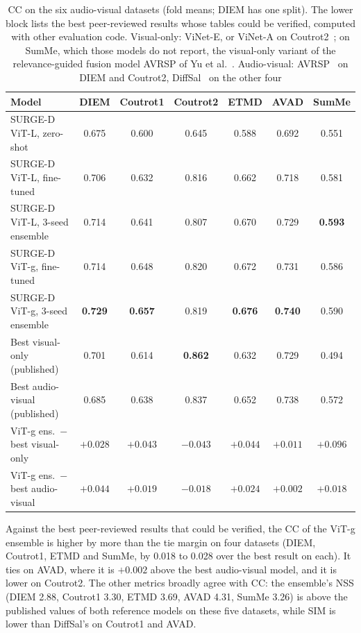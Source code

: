\begin{table}[htbp]
  \centering
  \caption{\acrshort{CC} on the six audio-visual datasets (fold means; DIEM has one split).
  The lower block lists the best peer-reviewed results whose tables could be
  verified, computed with other evaluation code. Visual-only: ViNet-E, or ViNet-A
  on Coutrot2~\cite{girmaji2025minimalistic}; on SumMe, which those models do not
  report, the visual-only variant of the relevance-guided fusion model AVRSP of
  Yu et al.~\cite{yu2026relevance}. Audio-visual: AVRSP~\cite{yu2026relevance} on
  DIEM and Coutrot2, DiffSal~\cite{xiong2024diffsal} on the other four}\label{tab:av}
  \footnotesize
  \setlength{\tabcolsep}{4pt}
  \begin{tabular}{@{}lcccccc@{}}
    \toprule
    \textbf{Model} & \textbf{DIEM} & \textbf{Coutrot1} & \textbf{Coutrot2} & \textbf{ETMD}
      & \textbf{AVAD} & \textbf{SumMe} \\
    \midrule
    SURGE-D \acrshort{ViT}-L, zero-shot       & 0.675 & 0.600 & 0.645 & 0.588 & 0.692 & 0.551 \\
    SURGE-D \acrshort{ViT}-L, fine-tuned      & 0.706 & 0.632 & 0.816 & 0.662 & 0.718 & 0.581 \\
    SURGE-D \acrshort{ViT}-L, 3-seed ensemble & 0.714 & 0.641 & 0.807 & 0.670 & 0.729 & \textbf{0.593} \\
    SURGE-D \acrshort{ViT}-g, fine-tuned      & 0.714 & 0.648 & 0.820 & 0.672 & 0.731 & 0.586 \\
    SURGE-D \acrshort{ViT}-g, 3-seed ensemble & \textbf{0.729} & \textbf{0.657} & 0.819 & \textbf{0.676} & \textbf{0.740} & 0.590 \\
    \midrule
    Best visual-only (published)   & 0.701 & 0.614 & \textbf{0.862} & 0.632 & 0.729 & 0.494 \\
    Best audio-visual (published)  & 0.685 & 0.638 & 0.837 & 0.652 & 0.738 & 0.572 \\
    \midrule
    \acrshort{ViT}-g ens.\ $-$ best visual-only  & $+0.028$ & $+0.043$ & $-0.043$ & $+0.044$ & $+0.011$ & $+0.096$ \\
    \acrshort{ViT}-g ens.\ $-$ best audio-visual & $+0.044$ & $+0.019$ & $-0.018$ & $+0.024$ & $+0.002$ & $+0.018$ \\
    \bottomrule
  \end{tabular}
\end{table}

Against the best peer-reviewed results that could be verified, the \acrshort{CC} of the
\acrshort{ViT}-g ensemble is higher by more than the tie margin on four datasets (DIEM,
Coutrot1, ETMD and SumMe, by 0.018 to 0.028 over the best result on each). It
ties on AVAD, where it is $+0.002$ above the best audio-visual model, and it is
lower on Coutrot2. The other metrics broadly agree with
\acrshort{CC}: the ensemble's \acrshort{NSS} (DIEM 2.88, Coutrot1 3.30, ETMD 3.69, AVAD 4.31, SumMe
3.26) is above the published values of both reference models on these five
datasets, while \acrshort{SIM} is lower than DiffSal's on Coutrot1 and AVAD.

